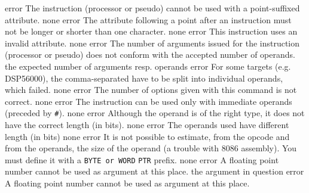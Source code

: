 \documentclass[12pt,twoside]{report}
\newcommand{\tty}[1]{{\tt #1}}
\begin{document}
\begin{description}
               {error}
               {The instruction (processor or pseudo) cannot be used with a
                point-suffixed attribute.}
               {none}
               {error}
               {The attribute following a point after an instruction must
                not be longer or shorter than one character.}
               {none}
               {error}
               {This instruction uses an invalid attribute.}
               {none}
               {error}
               {The number of arguments issued for the instruction (processor or
                pseudo) does not conform with the accepted number of
                operands.}
               {the expected number of arguments resp. operands}
               {error}
               {For some targets (e.g. DSP56000), the
                comma-separated have to be split into individual
                operands, which failed.}
               {none}
               {error}
               {The number of options given with this command is not
                correct.}
               {none}
               {error}
               {The instruction can be used only with immediate operands
                (preceded by \tty{\#}).}
               {none}
               {error}
               {Although the operand is of the right type, it does not have
                the correct length (in bits).}
               {none}
               {error}
               {The operands used have different length (in bits)}
               {none}
               {error}
               {It is not possible to estimate, from the opcode and from
                the operands, the size of the operand (a trouble with
                8086 assembly). You must define it with a \tty{BYTE or WORD}
                \tty{PTR} prefix.}
               {none}
               {error}
               {A floating point number cannot be used as argument at this place.}
               {the argument in question}
               {error}
               {A floating point number cannot be used as argument at this place.}

\end{description}
\end{document}
